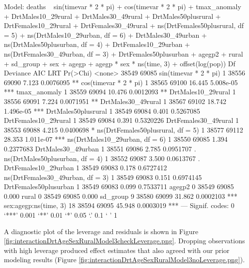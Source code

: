 \documentclass[a4paper]{article}                %
\begin{document}
\begin{Schunk}
\begin{Soutput}
Model:
deaths ~ sin(timevar * 2 * pi) + cos(timevar * 2 * pi) + tmax_anomaly + 
    DrtMales10_29rural + DrtMales30_49rural + DrtMales50plusrural + 
    DrtFemales10_29rural + DrtFemales30_49rural + ns(DrtFemales50plusrural, 
    df = 5) + ns(DrtMales10_29urban, df = 6) + DrtMales30_49urban + 
    ns(DrtMales50plusurban, df = 4) + DrtFemales10_29urban + 
    ns(DrtFemales30_49urban, df = 3) + DrtFemales50plusurban + 
    agegp2 + rural + sd_group + sex + agegp + agegp * sex * ns(time, 
    3) + offset(log(pop))
                                  Df Deviance   AIC    LRT  Pr(>Chi)    
<none>                                  38549 69085                     
sin(timevar * 2 * pi)              1    38556 69090  7.123 0.0076095 ** 
cos(timevar * 2 * pi)              1    38565 69100 16.445 5.008e-05 ***
tmax_anomaly                       1    38559 69094 10.476 0.0012093 ** 
DrtMales10_29rural                 1    38556 69091  7.224 0.0071951 ** 
DrtMales30_49rural                 1    38567 69102 18.742 1.496e-05 ***
DrtMales50plusrural                1    38549 69084  0.401 0.5267085    
DrtFemales10_29rural               1    38549 69084  0.391 0.5320226    
DrtFemales30_49rural               1    38553 69088  4.215 0.0400698 *  
ns(DrtFemales50plusrural, df = 5)  1    38577 69112 28.353 1.011e-07 ***
ns(DrtMales10_29urban, df = 6)     1    38550 69085  1.394 0.2377683    
DrtMales30_49urban                 1    38551 69086  2.785 0.0951707 .  
ns(DrtMales50plusurban, df = 4)    1    38552 69087  3.500 0.0613767 .  
DrtFemales10_29urban               1    38549 69083  0.178 0.6727412    
ns(DrtFemales30_49urban, df = 3)   1    38549 69083  0.151 0.6974145    
DrtFemales50plusurban              1    38549 69083  0.099 0.7533711    
agegp2                             0    38549 69085  0.000              
rural                              0    38549 69085  0.000              
sd_group                           9    38580 69099 31.862 0.0002103 ***
sex:agegp:ns(time, 3)             18    38594 69095 45.948 0.0003019 ***
---
Signif. codes:  0 ‘***’ 0.001 ‘**’ 0.01 ‘*’ 0.05 ‘.’ 0.1 ‘ ’ 1
\end{Soutput}
\end{Schunk}



        A diagnostic plot of the leverage and residuals is shown in Figure \ref{fig:interactionDrtAgeSexRuralModel3checkLeverage.png}.  Dropping observations with high leverage produced effect estimates that also agreed with our prior modeling results (Figure \ref{fig:interactionDrtAgeSexRuralModel3noLeverage.png}).
\end{document}
